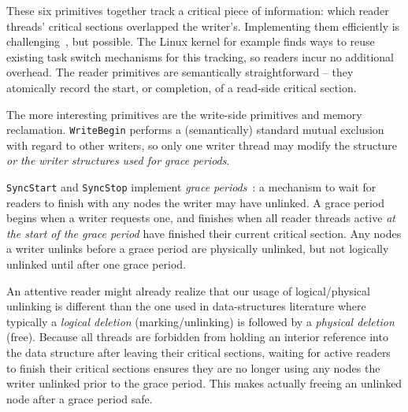 These six primitives together track a critical piece of information: which reader threads' critical sections overlapped the writer's.
Implementing them efficiently is challenging~\cite{urcu_ieee}, but possible.
The Linux kernel for example finds ways to reuse existing task switch mechanisms for this tracking, so readers incur no additional overhead.
The reader primitives are semantically straightforward -- they atomically record the start, or completion, of a read-side critical section. %

The more interesting primitives are the write-side primitives and memory reclamation.
\lstinline|WriteBegin| performs a (semantically) standard mutual exclusion with regard to other writers, so only one writer thread may modify the structure \emph{or the writer structures used for grace periods}. %

\lstinline|SyncStart| and \lstinline|SyncStop| implement \emph{grace periods}~\cite{grc}: a mechanism to wait for readers to finish with any nodes the writer may have unlinked.  A grace period begins when a writer requests one, and finishes when all reader threads active \emph{at the start of the grace period} have finished their current critical section.
Any nodes a writer unlinks before a grace period are physically unlinked, but not logically unlinked until after one grace period.

An attentive reader might already realize that our usage of logical/physical unlinking is different than the one used in data-structures literature where typically a \textit{logical deletion} (marking/unlinking) is followed by a \textit{physical deletion} (free).
Because all threads are forbidden from holding an interior reference into the data structure after leaving their critical sections, waiting for active readers to finish their critical sections ensures they are no longer using any nodes the writer unlinked prior to the grace period.
This makes actually freeing an unlinked node after a grace period safe.

